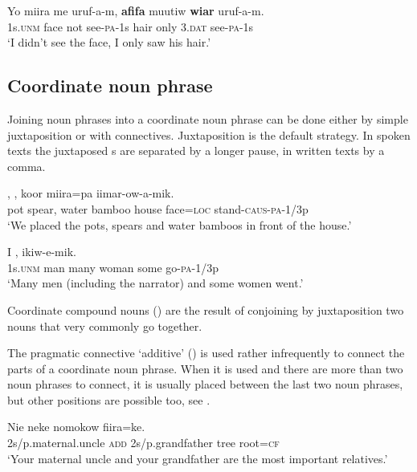 \ea%
\label{ex:4:x1938}
\gll Yo  miira  me  uruf-a-m,  \textbf{afifa}  muutiw  \textbf{wiar}  uruf-a-m. \\
   1s.\textsc{unm}  face  not  see-\textsc{pa}-1s  hair  only  3.\textsc{dat}  see-\textsc{pa}-1s   \\
\glt`I didn't see the face, I only saw his hair.'
\z

\subsection{Coordinate noun phrase} \label{sec:4.1.2}
{}
Joining noun phrases into a coordinate noun phrase can be done either by simple juxtaposition or with connectives. Juxtaposition is the default strategy.  In spoken texts the juxtaposed s are separated by a longer pause, in written texts by a comma.

\ea%
\label{ex:4:x810}
\gll {},  ,     koor  miira=pa  iimar-ow-a-mik. \\
  pot  spear,  water  bamboo  house  face=\textsc{loc}  stand-\textsc{caus}-\textsc{pa}-1/3p    \\
\glt`We placed the pots, spears and water bamboos in front of the house.'
\z

\ea%
\label{ex:4:x811}
\gll I   ,     ikiw-e-mik. \\
  1s.\textsc{unm}  man  many  woman  some  go-\textsc{pa}-1/3p    \\
\glt`Many men (including the narrator) and some women went.'
\z

Coordinate compound nouns () are the result of conjoining by juxtaposition two nouns that very commonly go together. 

The pragmatic connective  `additive' () is used rather infrequently to connect the parts of a coordinate noun phrase. When it is used and there are more than two noun phrases to connect, it is usually placed between the last two noun phrases, but other positions are possible too, see . 

\ea%
\label{ex:4:x812}
\gll Nie    neke  nomokow  fiira=ke. \\
    2s/p.maternal.uncle  \textsc{add}  2s/p.grandfather  tree  root=\textsc{cf}  \\
\glt`Your maternal uncle and your grandfather are the most important relatives.'
\z

